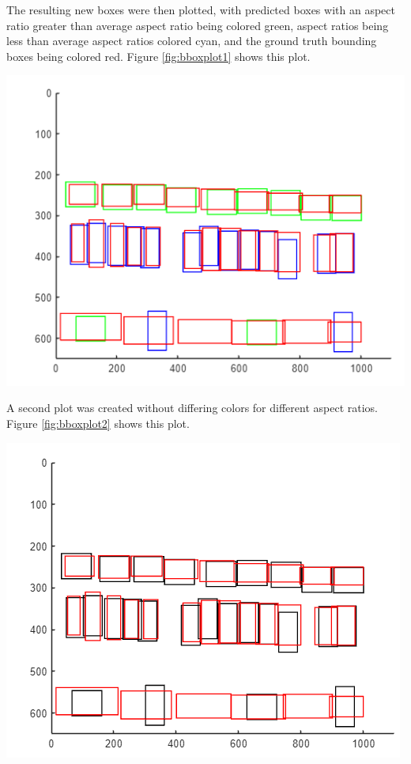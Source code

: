 \documentclass[man]{apa7}
\begin{document}
The resulting new boxes were then plotted, with predicted boxes with an aspect ratio greater than average aspect ratio being colored green, aspect ratios being less than average aspect ratios colored cyan, and the ground truth bounding boxes being colored red. Figure \ref{fig:bboxplot1} shows this plot.

\newpage

\begin{minipage}{\linewidth}
  \includegraphics[height=\textheight/4,width=\textwidth/2]{figures/finalBbox1.png}
  \label{fig:bboxplot1}
\end{minipage}

A second plot was created without differing colors for different aspect ratios. Figure \ref{fig:bboxplot2} shows this plot.

\begin{minipage}{\linewidth}
  \includegraphics[height=\textheight/4,width=\textwidth/2]{figures/bboxplot2.png}
  \label{fig:bboxplot2}
\end{minipage}
\end{document}

